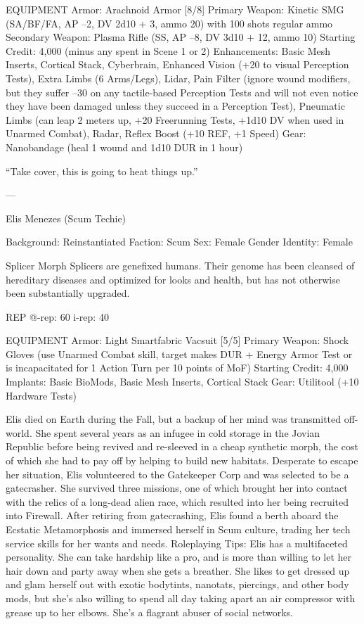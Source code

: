 EQUIPMENT
Armor: Arachnoid Armor [8/8]
Primary Weapon: Kinetic SMG (SA/BF/FA, AP –2, DV 2d10 + 3, ammo 20) with 100 shots regular ammo
Secondary Weapon: Plasma Rifle (SS, AP –8, DV 3d10 + 12, ammo 10)
Starting Credit: 4,000 (minus any spent in Scene 1 or 2)
Enhancements: Basic Mesh Inserts, Cortical Stack, Cyberbrain, Enhanced Vision (+20 to visual Perception Tests), Extra Limbs (6 Arms/Legs), Lidar, Pain Filter (ignore wound modifiers, but they suffer –30 on any tactile-based Perception Tests and will not even notice they have been damaged unless they succeed in a Perception Test), Pneumatic Limbs (can leap 2 meters up, +20 Freerunning Tests, +1d10 DV when used in Unarmed Combat), Radar, Reflex Boost (+10 REF, +1 Speed)
Gear: Nanobandage (heal 1 wound and 1d10 DUR in 1 hour)

“Take cover, this is going to heat things up.”

---

Elis Menezes (Scum Techie)

Background: Reinstantiated
Faction: Scum
Sex: Female
Gender Identity: Female

Splicer Morph
Splicers are genefixed humans. Their genome has been cleansed of hereditary diseases and optimized for looks and health, but has not otherwise been substantially upgraded.

REP
@-rep:	60
i-rep:	40

EQUIPMENT
Armor: Light Smartfabric Vacsuit [5/5]
Primary Weapon: Shock Gloves (use Unarmed Combat skill, target makes DUR + Energy Armor Test or is incapacitated for 1 Action Turn per 10 points of MoF)
Starting Credit: 4,000
Implants: Basic BioMods, Basic Mesh Inserts, Cortical Stack
Gear: Utilitool (+10 Hardware Tests)

Elis died on Earth during the Fall, but a backup of her mind was transmitted off-world. She spent several years as an infugee in cold storage in the Jovian Republic before being revived and re-sleeved in a cheap synthetic morph, the cost of which she had to pay off by helping to build new habitats. Desperate to escape her situation, Elis volunteered to the Gatekeeper Corp and was selected to be a gatecrasher. She survived three missions, one of which brought her into contact with the relics of a long-dead alien race, which resulted into her being recruited into Firewall. After retiring from gatecrashing, Elis found a berth aboard the Ecstatic Metamorphosis and immersed herself in Scum culture, trading her tech service skills for her wants and needs.
Roleplaying Tips: Elis has a multifaceted personality. She can take hardship like a pro, and is more than willing to let her hair down and party away when she gets a breather. She likes to get dressed up and glam herself out with exotic bodytints, nanotats, piercings, and other body mods, but she’s also willing to spend all day taking apart an air compressor with grease up to her elbows. She’s a flagrant abuser of social networks. 

